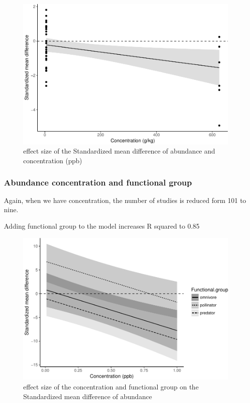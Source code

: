 \documentclass[]{elsarticle} %
\makeatletter
\def\maxwidth{\ifdim\Gin@nat@width>\linewidth\linewidth
\else\Gin@nat@width\fi}
\let\Oldincludegraphics\includegraphics
\renewcommand{\includegraphics}[1]{\Oldincludegraphics[width=\maxwidth]{#1}}
\makeatother
\begin{document}
\begin{figure}[htbp]
\centering
\includegraphics{MetanalysisNeonics_files/figure-latex/unnamed-chunk-13-1.pdf}
\caption{effect size of the Standardized mean difference of abundance
and concentration (ppb)}
\end{figure}

\subsubsection{Abundance concentration and functional
group}\label{abundance-concentration-and-functional-group}

Again, when we have concentration, the number of studies is reduced form
101 to nine.

Adding functional group to the model increases R squared to 0.85

\begin{figure}[htbp]
\centering
\includegraphics{MetanalysisNeonics_files/figure-latex/unnamed-chunk-15-1.pdf}
\caption{effect size of the concentration and functional group on the
Standardized mean difference of abundance}
\end{figure}
\end{document}
